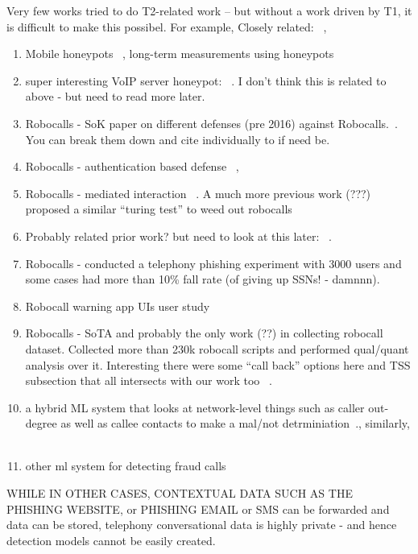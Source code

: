 Very few works tried to do T2-related work -- but without a work driven by T1, it is difficult to make this possibel. For example, Closely related: ~\cite{SahinRF17}, ~\cite{}



\begin{enumerate}
    \item Mobile honeypots ~\cite{GuptaSBA15,BalduzziGGGA16}, long-term measurements using honeypots~\cite{PrasadBMR20}
    \item  super interesting VoIP server honeypot: ~\cite{MondejarMS22}. I don't think this is related to above - but need to read more later.
    \item Robocalls - SoK paper on different defenses (pre 2016) against Robocalls.~\cite{TuDZA16}. You can break them down and cite individually to if need be. 
    \item Robocalls - authentication based defense ~\cite{ReavesBAVTS17}, ~\cite{DuY00KL23}
    \item Robocalls - mediated interaction ~\cite{PanditSPAY23}. A much more previous work (???) proposed a similar ``turing test'' to weed out robocalls~\cite{QuittekNTSBE07}
    \item Probably related prior work? but need to look at this later: ~\cite{PanditLPA21}. 
    \item Robocalls - conducted a telephony phishing experiment with 3000 users and some cases had more than 10\% fall rate (of giving up SSNs! - damnnn).~\cite{TuD0A19}
    \item Robocall warning app UIs user study ~\cite{ShermanBMGRT20}
    \item Robocalls - SoTA and probably the only work (??) in collecting robocall dataset. Collected more than 230k robocall scripts and performed qual/quant analysis over it. Interesting there were some ``call back'' options here and TSS subsection that all intersects with our work too ~\cite{PrasadDRR23}.
    \item a hybrid ML system that looks at network-level things such as caller out-degree as well as callee contacts to make a mal/not detrminiation~\cite{LiXLRWCZYS18}., similarly, ~\cite{LiuRPDS18,XingYWZD20}
    \item other ml system for detecting fraud calls ~\cite{KaleKMD21}
\end{enumerate}

WHILE IN OTHER CASES, CONTEXTUAL DATA SUCH AS THE PHISHING WEBSITE, or PHISHING EMAIL or SMS can be forwarded and data can be stored, telephony conversational data is highly private - and hence detection models cannot be easily created. 

